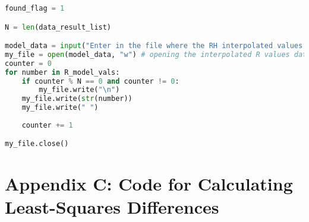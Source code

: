 \documentclass{article}
\begin{document}
\begin{footnotesize}
\begin{lstlisting}[language=Python,showstringspaces=false]
                found_flag = 1

N = len(data_result_list)

model_data = input("Enter in the file where the RH interpolated values should be stored: ")
my_file = open(model_data, "w") # opening the interpolated R values data file e.g. 'test_model.dat'
counter = 0
for number in R_model_vals:
    if counter % N == 0 and counter != 0:
        my_file.write("\n")
    my_file.write(str(number))
    my_file.write(" ")
    
    counter += 1

my_file.close() 

\end{lstlisting}
\end{footnotesize}

\section*{Appendix C: Code for Calculating Least-Squares Differences}
\label{app:appendix_C}
\end{document}
